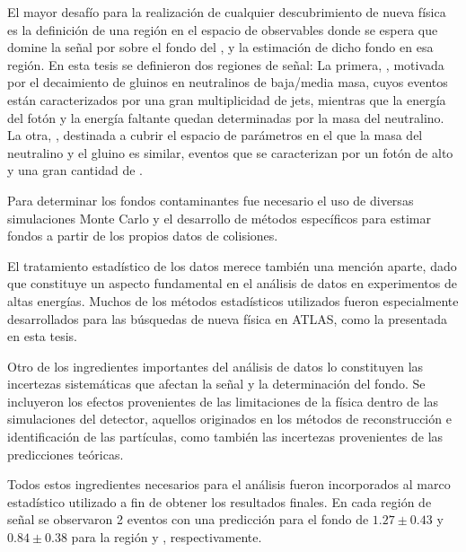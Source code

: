 
El mayor desafío para la realización de cualquier descubrimiento de nueva física
es la definición de una región en el espacio de observables donde se espera que
domine la señal por sobre el fondo del {\SM}, y la estimación de dicho fondo en
esa región. En esta tesis se definieron dos regiones de señal: La primera,
{\SRL}, motivada por el decaimiento de gluinos en neutralinos de baja/media
masa, cuyos eventos están caracterizados por una gran multiplicidad de jets,
mientras que la energía del fotón y la energía faltante quedan determinadas por
la masa del neutralino. La otra, {\SRH}, destinada a cubrir el espacio de
parámetros en el que la masa del neutralino y el gluino es similar, eventos que
se caracterizan por un fotón de alto {\pt} y una gran cantidad de {\met}.

Para determinar los fondos contaminantes fue necesario el uso de diversas
simulaciones Monte Carlo y el desarrollo de métodos específicos para estimar fondos a
partir de los propios datos de colisiones.

El tratamiento estadístico de los datos merece también una mención aparte, dado
que constituye un aspecto fundamental en el análisis de datos en experimentos de
altas energías. Muchos de los métodos estadísticos utilizados fueron
especialmente desarrollados para las búsquedas de nueva física en ATLAS, como la
presentada en esta tesis.

Otro de los ingredientes importantes del análisis de datos lo constituyen las
incertezas sistemáticas que afectan la señal y la determinación del fondo. Se
incluyeron los efectos provenientes de las limitaciones de la física dentro de
las simulaciones del detector, aquellos originados en los métodos de
reconstrucción e identificación de las partículas, como también las incertezas
provenientes de las predicciones teóricas.

Todos estos ingredientes necesarios para el análisis fueron incorporados al
marco estadístico utilizado a fin de obtener los resultados finales. En cada
región de señal se observaron 2 eventos con una predicción para el fondo de
$1.27\pm0.43$ y $0.84\pm 0.38$ para la región {\SRL} y {\SRH}, respectivamente.


